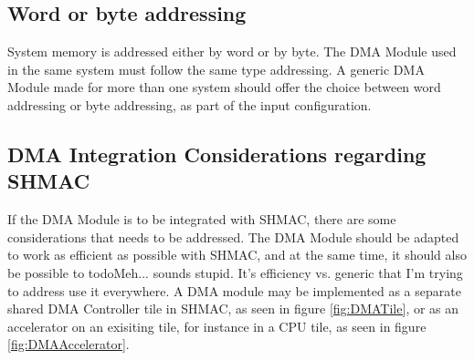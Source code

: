 %

\subsection{Word or byte addressing}
System memory is addressed either by word or by byte.
The DMA Module used in the same system must follow the same type addressing.
A generic DMA Module made for more than one system should offer the choice between word addressing or byte addressing, as part of the input configuration.

\subsection{DMA Integration Considerations regarding SHMAC}

If the DMA Module is to be integrated with SHMAC, there are some considerations that needs to be addressed.
The DMA Module should be adapted to work as efficient as possible with SHMAC, and at the same time, it should also be possible to todo{Meh... sounds stupid. It's efficiency vs. generic that I'm trying to address} use it everywhere. 
A DMA module may be implemented as a separate shared DMA Controller tile in SHMAC, as seen in figure \ref{fig:DMATile}, or as an accelerator on an exisiting tile, for instance in a CPU tile, as seen in figure \ref{fig:DMAAccelerator}.

